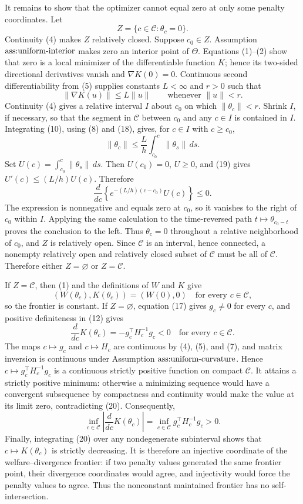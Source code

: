 It remains to show that the optimizer cannot equal zero at only some penalty coordinates.  Let
\[
 Z=\{c\in\mathcal C:\theta_c=0\}.
\]
Continuity (4) makes \(Z\) relatively closed.  Suppose \(c_0\in Z\).  Assumption \(\textnormal{ass:uniform-interior}\) makes zero an interior point of \(\Theta\).  Equations (1)--(2) show that zero is a local minimizer of the differentiable function \(K\); hence its two-sided directional derivatives vanish and \(\nabla K(0)=0\).  Continuous second differentiability from (5) supplies constants \(L<\infty\) and \(r>0\) such that
\[
 \|\nabla K(u)\|\leq L\|u\|
 \qquad\text{whenever }\|u\|<r.                               \tag{18}
\]
Continuity (4) gives a relative interval \(I\) about \(c_0\) on which \(\|\theta_c\|<r\).  Shrink \(I\), if necessary, so that the segment in \(\mathcal C\) between \(c_0\) and any \(c\in I\) is contained in \(I\).  Integrating (10), using (8) and (18), gives, for \(c\in I\) with \(c\geq c_0\),
\[
 \|\theta_c\|
 \leq\frac{L}{h}\int_{c_0}^c\|\theta_s\|\,ds.                \tag{19}
\]
Set \(U(c)=\int_{c_0}^c\|\theta_s\|\,ds\).  Then \(U(c_0)=0\), \(U\geq0\), and (19) gives \(U'(c)\leq(L/h)U(c)\).  Therefore
\[
 \frac{d}{dc}\left\{e^{-(L/h)(c-c_0)}U(c)\right\}\leq0.
\]
The expression is nonnegative and equals zero at \(c_0\), so it vanishes to the right of \(c_0\) within \(I\).  Applying the same calculation to the time-reversed path \(t\mapsto\theta_{c_0-t}\) proves the conclusion to the left.  Thus \(\theta_c=0\) throughout a relative neighborhood of \(c_0\), and \(Z\) is relatively open.  Since \(\mathcal C\) is an interval, hence connected, a nonempty relatively open and relatively closed subset of \(\mathcal C\) must be all of \(\mathcal C\).  Therefore either \(Z=\varnothing\) or \(Z=\mathcal C\).

If \(Z=\mathcal C\), then (1) and the definitions of \(W\) and \(K\) give
\[
 (W(\theta_c),K(\theta_c))=(W(0),0)
 \quad\text{for every }c\in\mathcal C,
\]
so the frontier is constant.  If \(Z=\varnothing\), equation (17) gives \(g_c\neq0\) for every \(c\), and positive definiteness in (12) gives
\[
 \frac{d}{dc}K(\theta_c)=-g_c^\top H_c^{-1}g_c<0
 \quad\text{for every }c\in\mathcal C.                        \tag{20}
\]
The maps \(c\mapsto g_c\) and \(c\mapsto H_c\) are continuous by (4), (5), and (7), and matrix inversion is continuous under Assumption \(\textnormal{ass:uniform-curvature}\).  Hence \(c\mapsto g_c^\top H_c^{-1}g_c\) is a continuous strictly positive function on compact \(\mathcal C\).  It attains a strictly positive minimum: otherwise a minimizing sequence would have a convergent subsequence by compactness and continuity would make the value at its limit zero, contradicting (20).  Consequently,
\[
 \inf_{c\in\mathcal C}
 \left|\frac{d}{dc}K(\theta_c)\right|
 =\inf_{c\in\mathcal C}g_c^\top H_c^{-1}g_c>0.                \tag{21}
\]
Finally, integrating (20) over any nondegenerate subinterval shows that \(c\mapsto K(\theta_c)\) is strictly decreasing.  It is therefore an injective coordinate of the welfare--divergence frontier: if two penalty values generated the same frontier point, their divergence coordinates would agree, and injectivity would force the penalty values to agree.  Thus the nonconstant maintained frontier has no self-intersection.
